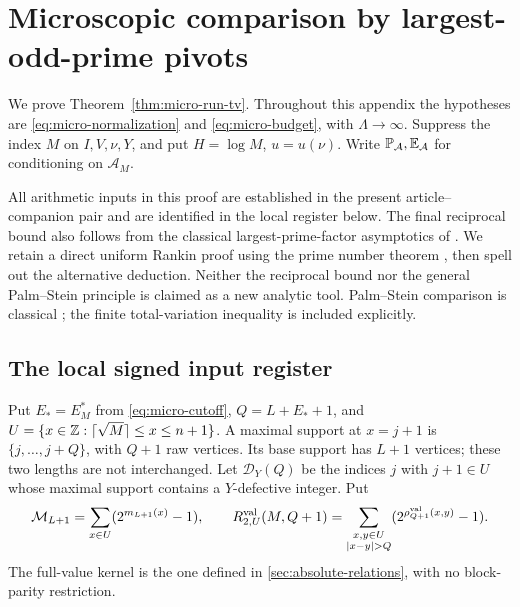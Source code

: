 \section{Microscopic comparison by largest-odd-prime pivots}\label{supp:sec:microscopic-pivots}
We prove Theorem~\ref{thm:micro-run-tv}. Throughout this appendix the hypotheses are
\eqref{eq:micro-normalization} and \eqref{eq:micro-budget}, with $\Lambda\to\infty$.
Suppress the index $M$ on $I,V,\nu,Y$, and put $H=\log M$, $u=u(\nu)$.
Write $\mathbb P_{\mathcal A},\mathbb E_{\mathcal A}$ for conditioning on $\mathcal A_M$.

All arithmetic inputs in this proof are established in the present
article--companion pair and are identified in the local register below.
The final reciprocal bound also follows from the classical
largest-prime-factor asymptotics of \cite{ErdosIvicPomerance1986}.
We retain a direct uniform Rankin proof using the prime number theorem
\cite{Tenenbaum2015}, then spell out the alternative deduction.
Neither the reciprocal bound nor the general Palm--Stein principle
is claimed as a new analytic tool. Palm--Stein comparison is classical
\cite{Barbour1988SteinProcess,ChenXia2004}; the finite total-variation
inequality is included explicitly.

\subsection{The local signed input register}\label{supp:pivot:sec:inputs}
Put $E_*=E_M^*$ from \eqref{eq:micro-cutoff}, $Q=L+E_*+1$, and
$U=\{x\in\mathbb Z:\lceil\sqrt M\rceil\le x\le n+1\}$.
A maximal support at $x=j+1$ is $\{j,\ldots,j+Q\}$, with $Q+1$
raw vertices. Its base support has $L+1$ vertices; these two lengths
are not interchanged.
Let $\mathcal D_Y(Q)$ be the indices $j$ with $j+1\in U$ whose maximal
support contains a $Y$-defective integer. Put
\[
 \mathcal M_{L+1}=\sum_{x\in U}(2^{m_{L+1}(x)}-1),\qquad
 R^{\rm val}_{2,U}(M,Q+1)=
 \sum_{\substack{x,y\in U\\|x-y|>Q}}
           (2^{\rho^{\rm val}_{Q+1}(x,y)}-1).
\]
The full-value kernel is the one defined in
\cref{sec:absolute-relations}, with no block-parity restriction.

